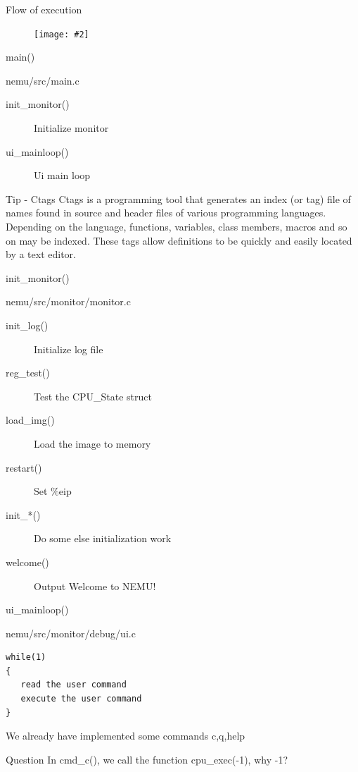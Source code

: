 \documentclass{beamer}
\newcommand{\fignocaption}[2]{
	\begin{figure}[htp]
		\centering
		\texttt{[image: \#2]}
	\end{figure}
}
\begin{document}
\begin{frame}{Flow of execution}
\fignocaption{scale=0.35}{main.c.png}
\end{frame}

\begin{frame}{main()}
	\begin{block}{nemu/src/main.c}
		\begin{description}
			\item[init\_monitor()] Initialize monitor
			\item[ui\_mainloop()] Ui main loop
		\end{description}
	\end{block}
	\begin{alertblock}{Tip - Ctags}
Ctags is a programming tool that generates an index (or tag) file of names found in source and header files of various programming languages. Depending on the language, functions, variables, class members, macros and so on may be indexed. These tags allow definitions to be quickly and easily located by a text editor.
	\end{alertblock}
\end{frame}

\begin{frame}{init\_monitor()}
	\begin{block}{nemu/src/monitor/monitor.c}
	\begin{description}
		\item [init\_log()]Initialize log file
		\item [reg\_test()]Test the CPU\_State struct
		\item [load\_img()]Load the image to memory
		\item [restart()]Set \%eip
		\item [init\_*()]Do some else  initialization work
		\item [welcome()]Output \alert{Welcome to NEMU!}
	\end{description}
\end{block}
\end{frame}


\begin{frame}[fragile]{ui\_mainloop()}
	\begin{block}{nemu/src/monitor/debug/ui.c}
\begin{verbatim}
while(1)
{
   read the user command
   execute the user command
}
\end{verbatim}
	\end{block}
\begin{block}{We already have implemented some commands}
	c,q,help
\end{block}

\begin{block}

\end{block}

\begin{exampleblock}{Question}
	In cmd\_c(), we call the function cpu\_exec(-1), why -1? 
\end{exampleblock}

\end{frame}
\end{document}
